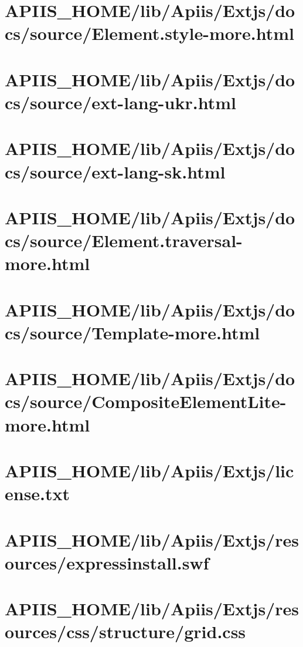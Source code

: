 \section{APIIS\_HOME/lib/Apiis/Extjs/docs/source/Element.style-more.html} 
\section{APIIS\_HOME/lib/Apiis/Extjs/docs/source/ext-lang-ukr.html} 
\section{APIIS\_HOME/lib/Apiis/Extjs/docs/source/ext-lang-sk.html} 
\section{APIIS\_HOME/lib/Apiis/Extjs/docs/source/Element.traversal-more.html} 
\section{APIIS\_HOME/lib/Apiis/Extjs/docs/source/Template-more.html} 
\section{APIIS\_HOME/lib/Apiis/Extjs/docs/source/CompositeElementLite-more.html} 
\section{APIIS\_HOME/lib/Apiis/Extjs/license.txt} 
\section{APIIS\_HOME/lib/Apiis/Extjs/resources/expressinstall.swf} 
\section{APIIS\_HOME/lib/Apiis/Extjs/resources/css/structure/grid.css} 
